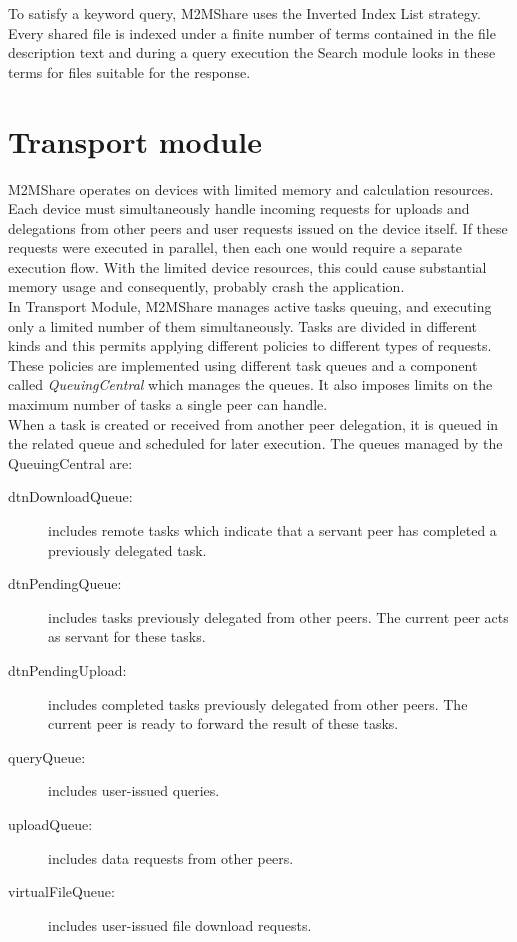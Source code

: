 To satisfy a keyword query, M2MShare uses the Inverted Index List strategy. Every shared file is indexed under a finite number of terms contained in the file description text and during a query execution the Search module looks in these terms for files suitable for the response.


\section{Transport module}
M2MShare operates on devices with limited memory and calculation resources. Each device must simultaneously handle incoming requests for uploads and delegations from other peers and user requests issued on the device itself. If these requests were executed in parallel, then each one would require a separate execution flow. With the limited device resources, this could cause substantial memory usage and consequently, probably crash the application.
\\

In Transport Module, M2MShare manages active tasks queuing, and executing only a limited number of them simultaneously. Tasks are divided in different kinds and this permits applying different policies to different types of requests. These policies are implemented using different task queues and a component called \textit{QueuingCentral} which manages the queues. It also imposes limits on the maximum number of tasks a single peer can handle.
\\

When a task is created or received from another peer delegation, it is queued in the related queue and scheduled for later execution. The queues managed by the QueuingCentral are:
\begin{description}
\item[dtnDownloadQueue:] includes remote tasks which indicate that a servant peer has completed a previously delegated task.
\item[dtnPendingQueue:] includes tasks previously delegated from other peers. The current peer acts as servant for these tasks.
\item[dtnPendingUpload:] includes completed tasks previously delegated from other peers. The current peer is ready to forward the result of these tasks.
\item[queryQueue:] includes user-issued queries.
\item[uploadQueue:] includes data requests from other peers.
\item[virtualFileQueue:] includes user-issued file download requests.
\end{description}

